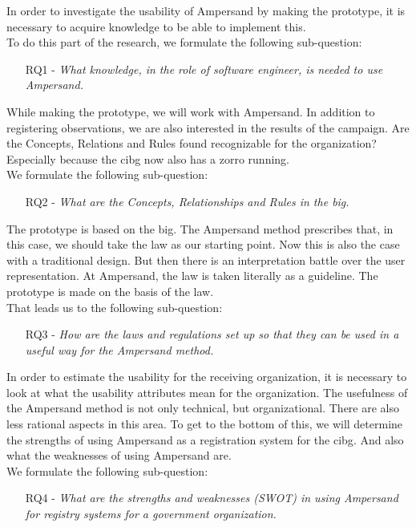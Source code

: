In order to investigate the usability of Ampersand by making the prototype, it is necessary to acquire knowledge to be able to implement this.
\\To do this part of the research, we formulate the following sub-question:
\begin{enumerate}
    \item[RQ1]- \textit{What knowledge, in the role of software engineer, is needed to use Ampersand.}
\end{enumerate}

While making the prototype, we will work with Ampersand.
In addition to registering observations, we are also interested in the results of the campaign.
Are the Concepts, Relations and Rules found recognizable for the organization?
Especially because the \acrshort{cibg} now also has a \acrshort{zorro} running.
\\We formulate the following sub-question:
\begin{enumerate}
    \item[RQ2]- \textit{What are the Concepts, Relationships and Rules in the \acrshort{big}.}
\end{enumerate}

The prototype is based on the \acrshort{big}.
The Ampersand method prescribes that, in this case, we should take the law as our starting point.
Now this is also the case with a traditional design.
But then there is an interpretation battle over the user representation.
At Ampersand, the law is taken literally as a guideline.
The prototype is made on the basis of the law.
\\That leads us to the following sub-question:
\begin{enumerate}
    \item[RQ3]- \textit{How are the laws and regulations set up so that they can be used in a useful way for the Ampersand method.}
\end{enumerate}

In order to estimate the usability for the receiving organization, it is necessary to look at what the usability attributes mean for the organization.
The usefulness of the Ampersand method is not only technical, but organizational.
There are also less rational aspects in this area.
To get to the bottom of this, we will determine the strengths of using Ampersand as a registration system for the \acrshort{cibg}.
And also what the weaknesses of using Ampersand are.
\\We formulate the following sub-question:
\begin{enumerate}
    \item[RQ4]- \textit{What are the strengths and weaknesses (SWOT) in using Ampersand for registry systems for a government organization.}
\end{enumerate}

